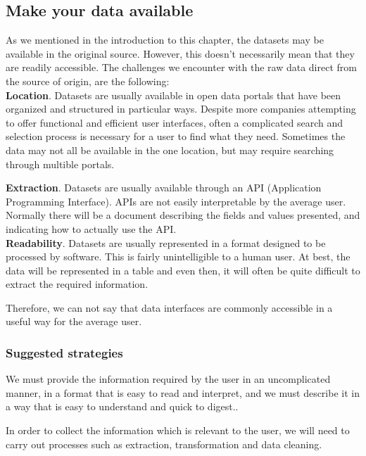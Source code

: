 \subsection{Make your data available}
    
As we mentioned in the introduction to this chapter, the datasets may be available in the original source. However, this doesn't necessarily
mean that they are readily accessible.
The challenges we encounter with the raw data direct from the source of origin, are the following: \\   
 
\textbf{Location}. Datasets are usually available in open data portals that have been organized and structured in particular ways.
Despite more companies attempting to offer functional and efficient user interfaces, often a complicated search and selection process is necessary for a user to find what they need. Sometimes the data may not all be available in the one location, but may require searching through multible portals.

\textbf{Extraction}. Datasets are usually available through an API (Application Programming Interface). APIs are not easily interpretable by the average user. Normally there will be a document describing the fields and values presented, and indicating how to actually use the API. \\

\textbf{Readability}. Datasets are usually represented in a format designed to be processed by software. This is fairly unintelligible to a human user. At best,
the data will be represented in a table and even then, it will often be quite difficult to extract the required information.

Therefore, we can not say that data interfaces are commonly accessible in a useful way for the average user. \\

\subsubsection*{Suggested strategies} 

We must provide the information required by the user in an uncomplicated manner, in a format that is easy to read and interpret, and we must describe it in a way that is easy to understand and quick to digest..

In order to collect the information which is relevant to the user, we will need to carry out processes such as extraction, transformation and
data cleaning.
 
